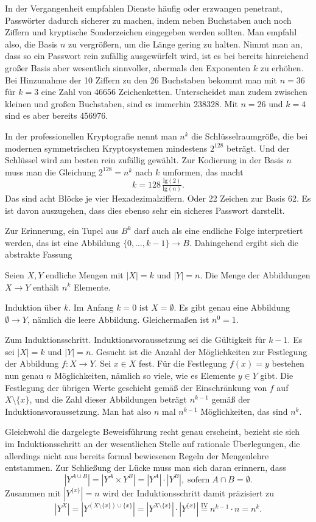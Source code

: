 In der Vergangenheit empfahlen Dienste häufig oder erzwangen penetrant,
Passwörter dadurch sicherer zu machen, indem neben Buchstaben auch noch
Ziffern und kryptische Sonderzeichen eingegeben werden sollten. Man
empfahl also, die Basis $n$ zu vergrößern, um die Länge gering zu halten.
Nimmt man an, dass so ein Passwort rein zufällig ausgewürfelt wird, ist
es bei bereits hinreichend großer Basis aber wesentlich sinnvoller,
abermals den Exponenten $k$ zu erhöhen. Bei Hinzunahme der 10 Ziffern zu
den 26 Buchstaben bekommt man mit $n=36$ für $k=3$ eine Zahl von 46656
Zeichenketten. Unterscheidet man zudem zwischen kleinen und großen
Buchstaben, sind es immerhin 238328. Mit $n=26$ und $k=4$ sind es aber
bereits 456976.

In der professionellen Kryptografie nennt man $n^k$ die
Schlüsselraumgröße, die bei modernen symmetrischen Kryptosystemen
mindestens $2^{128}$ beträgt. Und der Schlüssel wird am besten rein
zufällig gewählt. Zur Kodierung in der Basis $n$ muss man die Gleichung
$2^{128} = n^k$ nach $k$ umformen, das macht
\[k = 128\,\tfrac{\mathrm{lg}(2)}{\mathrm{lg}(n)}.\]
Das sind acht Blöcke je vier Hexadezimalziffern. Oder 22 Zeichen
zur Basis 62. Es ist davon auszugehen, dass dies ebenso sehr ein sicheres
Passwort darstellt.

Zur Erinnerung, ein Tupel aus $B^k$ darf auch als eine endliche Folge
interpretiert werden, das ist eine Abbildung
$\{0,\ldots,k-1\}\to B.$
Dahingehend ergibt sich die abstrakte Fassung

\begin{Satz}\label{Anzahl-Abb}\newlinefirst
Seien $X,Y$ endliche Mengen mit $|X| = k$ und $|Y|=n$. Die Menge
der Abbildungen $X\to Y$ enthält $n^k$ Elemente.
\end{Satz}
\begin{Beweis}
Induktion über $k$. Im Anfang $k=0$ ist $X=\emptyset$. Es gibt genau
eine Abbildung $\emptyset\to Y$, nämlich die leere Abbildung.
Gleichermaßen ist $n^0=1$.

Zum Induktionsschritt. Induktionsvoraussetzung sei die Gültigkeit
für $k-1$. Es  sei $|X|=k$ und $|Y|=n$. Gesucht ist die Anzahl
der Möglichkeiten zur Festlegung der Abbildung $f\colon X\to Y$.
Sei $x\in X$ fest. Für die Festlegung $f(x)=y$ bestehen nun genau $n$
Möglichkeiten, nämlich so viele, wie es Elemente $y\in Y$ gibt.
Die Festlegung der übrigen Werte geschieht gemäß der Einschränkung
von $f$ auf $X\setminus\{x\}$, und die Zahl dieser Abbildungen beträgt
$n^{k-1}$ gemäß der Induktionsvoraussetzung. Man hat also $n$ mal
$n^{k-1}$ Möglichkeiten, das sind $n^k$.\,\qedsymbol
\end{Beweis}
Gleichwohl die dargelegte Beweisführung recht genau erscheint,
bezieht sie sich im Induktionsschritt an der wesentlichen Stelle
auf rationale Überlegungen, die allerdings nicht aus bereits
formal bewiesenen Regeln der Mengenlehre entstammen. Zur Schließung der
Lücke muss man sich daran erinnern, dass
\[|Y^{A\cup B}| = |Y^A\times Y^B| = |Y^A|\cdot |Y^B|,\;
\text{sofern}\; A\cap B=\emptyset.\]
Zusammen mit $|Y^{\{x\}}|=n$ wird der Induktionsschritt damit präzisiert zu
\[|Y^X| = |Y^{(X\setminus\{x\})\cup\{x\}}| = |Y^{X\setminus\{x\}}|\cdot |Y^{\{x\}}|
\stackrel{\mathrm{IV}}= n^{k-1}\cdot n = n^k.\]

